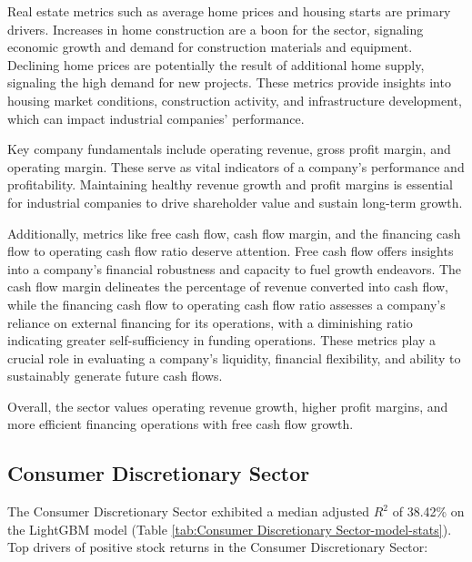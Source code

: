 \documentclass[12pt,a4paper,english]{article}
\begin{document}
Real estate metrics such as average home prices and housing starts are primary drivers. Increases in home construction are a boon for the sector, signaling economic growth and demand for construction materials and equipment. Declining home prices are potentially the result of additional home supply, signaling the high demand for new projects. These metrics provide insights into housing market conditions, construction activity, and infrastructure development, which can impact industrial companies' performance.

Key company fundamentals include operating revenue, gross profit margin, and operating margin. These serve as vital indicators of a company's performance and profitability. Maintaining healthy revenue growth and profit margins is essential for industrial companies to drive shareholder value and sustain long-term growth.

Additionally, metrics like free cash flow, cash flow margin, and the financing cash flow to operating cash flow ratio deserve attention. Free cash flow offers insights into a company's financial robustness and capacity to fuel growth endeavors. The cash flow margin delineates the percentage of revenue converted into cash flow, while the financing cash flow to operating cash flow ratio assesses a company's reliance on external financing for its operations, with a diminishing ratio indicating greater self-sufficiency in funding operations. These metrics play a crucial role in evaluating a company's liquidity, financial flexibility, and ability to sustainably generate future cash flows.

Overall, the sector values operating revenue growth, higher profit margins, and more efficient financing operations with free cash flow growth.

\subsection{Consumer Discretionary Sector}
\label{sec:consumer-dis}

The Consumer Discretionary Sector exhibited a median adjusted $R^2$ of 38.42\% on the LightGBM model (Table \ref{tab:Consumer Discretionary Sector-model-stats}). Top drivers of positive stock returns in the Consumer Discretionary Sector:

\end{document}
